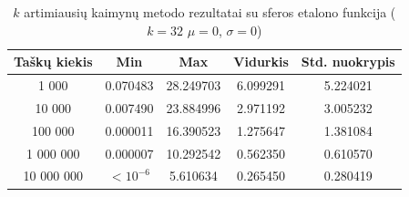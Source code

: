 \begin{table}[H]
    \centering
    \begin{tabular}{|c|c|c|c|c|}
        \hline
        \textbf{Taškų kiekis} & \textbf{Min} & \textbf{Max} & \textbf{Vidurkis} & \textbf{Std. nuokrypis} \\ \hline
        1 000        & 0.070483 & 28.249703 & 6.099291 & 5.224021 \\ \hline
        10 000       & 0.007490 & 23.884996 & 2.971192 & 3.005232 \\ \hline
        100 000      & 0.000011 & 16.390523 & 1.275647 & 1.381084 \\ \hline
        1 000 000    & 0.000007 & 10.292542 & 0.562350 & 0.610570 \\ \hline
        10 000 000   & $<10^{-6}$ & 5.610634 & 0.265450 & 0.280419 \\ \hline
    \end{tabular}
    \caption{$k$ artimiausių kaimynų metodo rezultatai su sferos etalono funkcija ($k = 32$ $\mu = 0$, $\sigma = 0$)}
\end{table}